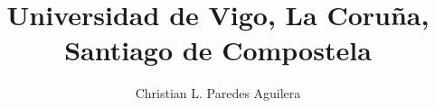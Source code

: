 \normalfont

\author{Christian L. Paredes Aguilera}
\title{\small Universidad de Vigo, La Coruña, Santiago de Compostela}
\date{}
\pagestyle{empty}
\maketitle
\thispagestyle{empty}
\let\cleardoublepage\clearpage
\tableofcontents								%


 
\let\cleardoublepage\clearpage
